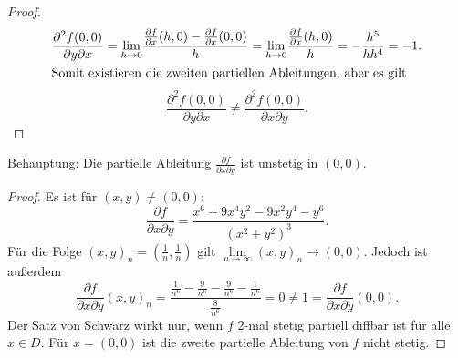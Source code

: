 \documentclass{article}
\theoremstyle{definition}
\begin{document}
\begin{enumerate}[(a)]
\begin{proof}
\begin{align*}
			\frac{\partial^2f(0,0)}{\partial y\partial x}&=\underset{h\to 0}{\lim}\frac{\frac{\partial f}{\partial x}(h,0)-\frac{\partial f}{\partial x}(0,0)}{h}=\underset{h\to 0}{\lim}\frac{\frac{\partial f}{\partial x}(h,0)}{h}=-\frac{h^5}{hh^4}=-1.\\
			\intertext{Somit existieren die zweiten partiellen Ableitungen, aber es gilt }
		\end{align*}
		$$\frac{\partial^2f(0,0)}{\partial y\partial x}\neq \frac{\partial^2f(0,0)}{\partial x\partial y}.$$
	\end{proof}
	Behauptung: Die partielle Ableitung $\frac{\partial f}{\partial x\partial y}$ ist unstetig in $(0,0)$.
	\begin{proof}
		Es ist für $(x,y)\neq (0,0)$:
		$$\frac{\partial f}{\partial x\partial y}=\frac{x^6+9x^4y^2-9x^2y^4-y^6}{(x^2+y^2)^3}.$$
		Für die Folge $(x,y)_n=(\frac{1}{n},\frac{1}{n})$ gilt $\underset{n\to \infty}{\lim}(x,y)_n\longrightarrow (0,0).$ Jedoch ist außerdem 
		$$\frac{\partial f}{\partial x\partial y}(x,y)_n=\frac{\frac{1}{n^6}-\frac{9}{n^6}-\frac{9}{n^6}-\frac{1}{n^6}}{\frac{8}{n^6}}=0\neq 1=\frac{\partial f}{\partial x\partial y}(0,0).$$
		Der Satz von Schwarz wirkt nur, wenn $f$ 2-mal stetig partiell diffbar ist für alle $x\in D.$ Für $x=(0,0)$ ist die zweite partielle Ableitung von $f$ nicht stetig.
	\end{proof}

\end{enumerate}
\end{document}
